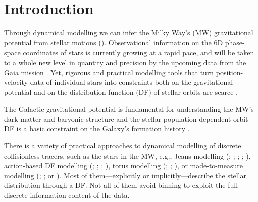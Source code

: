 \documentclass[iop,revtex4]{emulateapj}
\newcommand{\NEW}[1]{\textcolor{ForestGreen}{#1}}
\begin{document}

\section{Introduction} \label{sec:intro}

Through dynamical modelling we can infer the Milky Way's (MW) gravitational potential from stellar motions (\citealt{2008gady.book.....B,2011Prama..77...39B,2013A&ARv..21...61R}). Observational information on the 6D phase-space coordinates of stars is currently growing at a rapid pace, and will be taken to a whole new level in quantity and precision by the upcoming data from the Gaia mission \citep{2001A&A...369..339P}. Yet, rigorous and practical modelling tools that turn position-velocity data of individual stars into constraints both on the gravitational potential and on the distribution function (DF) of stellar orbits are scarce \citep{2013A&ARv..21...61R}.

The Galactic gravitational potential is fundamental for understanding the MW's dark matter and baryonic structure \citep{2012EPJWC..1910002M,2013A&ARv..21...61R,2013PhR...531....1S,2014JPhG...41f3101R} and the stellar-population-dependent orbit DF is a basic constraint on the Galaxy's formation history \citep{2013NewAR..57...29B,2015MNRAS.449.3479S}.

There is a variety of practical approaches to dynamical modelling of discrete collisionless tracers, such as the stars in the MW, e.g., Jeans modelling (\citealt{1989MNRAS.239..605K}; \citealt{2012ApJ...756...89B}; \citealt{2012MNRAS.425.1445G}; \citealt{2013ApJ...772..108Z}; \citealt{2015MNRAS.452..956B}), action-based DF modelling (\citealt{2013ApJ...779..115B}; \citealt{2014MNRAS.445.3133P}; \citealt{2015MNRAS.449.3479S}\NEW{; \citealt{2016arXiv160309332D}}), torus modelling (\citealt{2008MNRAS.390..429M}; \citealt{2012MNRAS.419.2251M}; \citealt{2013MNRAS.433.1411M}), or made-to-measure modelling (\citealt{1996MNRAS.282..223S}; \citealt{2007MNRAS.376...71D}; or \citealt{2014MNRAS.443.2112H}). Most of them---explicitly or implicitly---describe the stellar distribution through a DF. Not all of them avoid binning to exploit the full discrete information content of the data.
\end{document}
